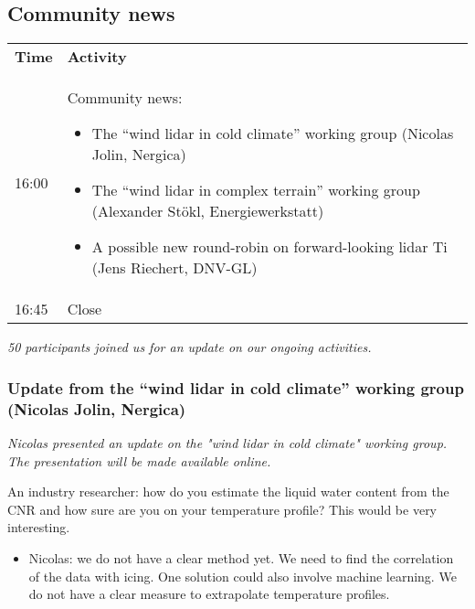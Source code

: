 \subsection{Community news}

\begin{table}[!h]
  \centering
  \begin{tabular}{@{}|p{}|p{}|@{}}
  \rowcolor{Task32Blue2} \textbf{Time} & \textbf{Activity} \\  
  16:00 & Community news:
    \begin{itemize}
      \item The \enquote{wind lidar in cold climate} working group (Nicolas Jolin, Nergica)
      \item The \enquote{wind lidar in complex terrain} working group (Alexander Stökl, Energiewerkstatt)
      \item A possible new round-robin on forward-looking lidar Ti (Jens Riechert, DNV-GL)
    \end{itemize}\\
  16:45 & Close \\
  \end{tabular}
  \label{tab:day2-community-news-agenda}
\end{table}

\emph{50 participants joined us for an update on our ongoing activities.}

\subsubsection[Update from the \enquote{wind lidar in cold climate} working group]{Update from the \enquote{wind lidar in cold climate} working group (Nicolas Jolin, Nergica)}

\emph{Nicolas presented an update on the "wind lidar in cold climate" working group. The presentation will be made available online.}

An industry researcher: how do you estimate the liquid water content from the CNR and how sure are you on your temperature profile? This would be very interesting.

\begin{itemize}
\item Nicolas: we do not have a clear method yet. We need to find the   correlation of the data with icing. One solution could also involve machine learning. We do not have a clear measure to extrapolate temperature profiles.
\end{itemize}

